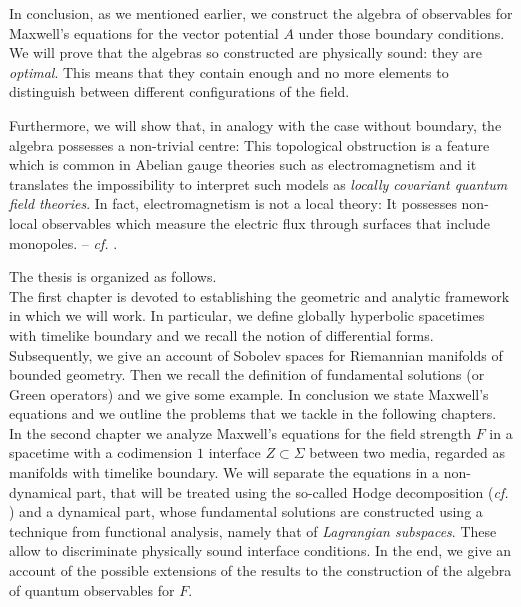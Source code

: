 In conclusion, as we mentioned earlier, we construct the algebra of observables for Maxwell's equations for the vector potential $A$ under those boundary conditions. We will prove that the algebras so constructed are physically sound: they are \emph{optimal}. This means that they contain enough and no more elements to distinguish between different configurations of the field.

Furthermore, we will show that, in analogy with the case without boundary, the algebra possesses a non-trivial centre: This topological obstruction is a feature which is common in Abelian gauge theories such as electromagnetism and it translates the impossibility to interpret such models as \emph{locally covariant quantum field theories}. In fact, electromagnetism is not a local theory: It possesses non-local observables which measure the electric flux through surfaces that include monopoles. -- \emph{cf.} \cite{Dappiaggi-Hack-Sanders-14}.\\

\vskip2cm

The thesis is organized as follows.\\
The first chapter is devoted to establishing the geometric and analytic framework in which we will work. In particular, we define globally hyperbolic spacetimes with timelike boundary and we recall the notion of differential forms. Subsequently, we give an account of Sobolev spaces for Riemannian manifolds of bounded geometry. Then we recall the definition of fundamental solutions (or Green operators) and we give some example. In conclusion we state Maxwell's equations and we outline the problems that we tackle in the following chapters.\\

In the second chapter we analyze Maxwell's equations for the field strength $F$ in a spacetime with a codimension $1$ interface $Z\subset \Sigma$ between two media, regarded as manifolds with timelike boundary. We will separate the equations in a non-dynamical part, that will be treated using the so-called Hodge decomposition (\emph{cf.} \cite{Schwarz-95}) and a dynamical part, whose fundamental solutions are constructed using a technique from functional analysis, namely that of \emph{Lagrangian subspaces}. These allow to discriminate physically sound interface conditions. In the end, we give an account of the possible extensions of the results to the construction of the algebra of quantum observables for $F$.\\

